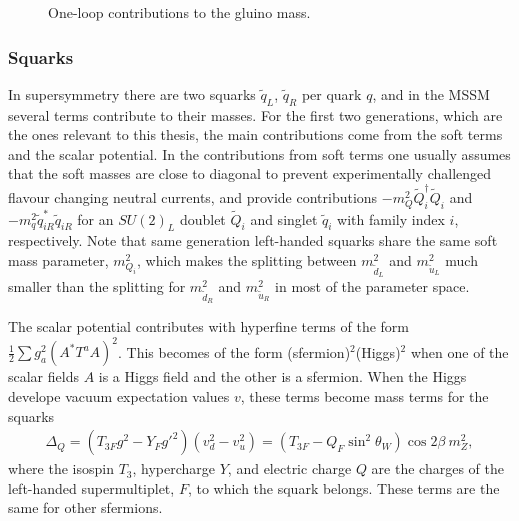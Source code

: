 \documentclass[twoside,english]{uiofysmaster}
\begin{document}
{\begin{figure}
\caption[One-loop corrections to the gluino mass]{One-loop contributions to the gluino mass.}
\label{Fig:: physical background : Gluino loop contributions}
\end{figure}

\subsubsection{Squarks}\label{Sec:: phys back : Squarks}
In supersymmetry there are two squarks $\widetilde{q}_L$, $\widetilde{q}_R$   per quark $q$, and in the MSSM several terms contribute to their masses. For the first two generations, which are the ones relevant to this thesis, the main contributions come from the soft terms and the scalar potential. In the contributions from soft terms one usually assumes that the soft masses are close to diagonal to prevent experimentally challenged flavour changing neutral currents, and provide contributions $-m_Q^2 \widetilde{Q}_i^{\dagger} \widetilde{Q}_i$ and $-m_q^2 \widetilde{q}_{iR}^* \widetilde{q}_{iR}$ for an $SU(2)_L$ doublet $\widetilde{Q}_i$ and singlet $\widetilde{q}_i$ with family index $i$, respectively. Note that same generation left-handed squarks share the same soft mass parameter, $m_{Q_i}^2$, which makes the splitting between $m_{\widetilde{d}_L}^2$ and $m_{\widetilde{u}_L}^2$ much smaller than the splitting for $m_{\widetilde{d}_R}^2$ and $m_{\widetilde{u}_R}^2$ in most of the parameter space. 

The scalar potential contributes with hyperfine terms of the form $\frac{1}{2} \sum g_a^2 (A^* T^a A)^2$. This becomes of the form (sfermion)$^2$(Higgs)$^2$ when one of the scalar fields $A$ is a Higgs field and the other is a sfermion. When the Higgs develope vacuum expectation values $v$, these terms become mass terms for the squarks
\begin{align}
\Delta_Q = (T_{3F}g^2 - Y_F{g'}^2)(v_d^2 - v_u^2) = (T_{3F} - Q_F \sin^2 \theta_W ) \cos 2 \beta ~ m_Z^2,
\end{align} 
where the isospin $T_3$, hypercharge $Y$, and electric charge $Q$ are the charges of the left-handed supermultiplet, $F$, to which the squark belongs. These terms are the same for other sfermions. 

}
\end{document}
